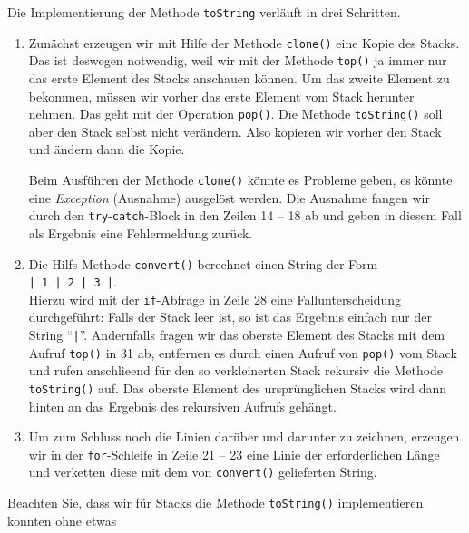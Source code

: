 \begin{enumerate}
      Die Implementierung der Methode \texttt{toString} verl\"auft in drei Schritten.
      \begin{enumerate}
      \item Zun\"achst erzeugen wir mit Hilfe der Methode \texttt{clone()} eine Kopie des
            Stacks.  Das ist deswegen notwendig, weil wir mit der Methode \texttt{top()}
            ja immer nur das erste Element des Stacks anschauen k\"onnen.  Um das zweite
            Element zu bekommen, m\"ussen wir vorher das erste Element vom Stack herunter
            nehmen.  Das geht mit der Operation \texttt{pop()}.  Die Methode
            \texttt{toString()} soll aber den Stack selbst nicht ver\"andern.  Also kopieren
            wir vorher den Stack und \"andern dann die Kopie.

            Beim Ausf\"uhren der Methode \texttt{clone()} k\"onnte es Probleme geben, es
            k\"onnte eine \emph{Exception} (Ausnahme) ausgel\"ost werden.  Die Ausnahme
            fangen wir durch den \texttt{try}-\texttt{catch}-Block in den Zeilen 14 -- 18
            ab und geben in diesem Fall als Ergebnis eine Fehlermeldung zur\"uck.
      \item Die Hilfs-Methode \texttt{convert()} berechnet einen String der Form \\[0.1cm]
            \hspace*{1.3cm} \texttt{| 1 | 2 | 3 |}. \\[0.1cm]
            Hierzu wird mit der \texttt{if}-Abfrage in Zeile 28 eine Fallunterscheidung 
            durchgef\"uhrt: Falls der Stack leer ist, so ist das Ergebnis einfach nur der
            String ``\texttt{|}''.  Andernfalls fragen wir das oberste Element des Stacks
            mit dem Aufruf \texttt{top()} in 31 ab, entfernen es durch einen Aufruf von
            \texttt{pop()} vom Stack und rufen anschlie\3end f\"ur den so verkleinerten Stack
            rekursiv die Methode \texttt{toString()} auf.  Das oberste Element des
            urspr\"unglichen Stacks wird dann hinten an das Ergebnis des rekursiven Aufrufs geh\"angt.
      \item Um zum Schluss noch die Linien dar\"uber und darunter zu zeichnen, erzeugen wir
            in der \texttt{for}-Schleife in Zeile 21 -- 23 eine Linie der erforderlichen
            L\"ange und verketten diese mit dem von \texttt{convert()} gelieferten String.
      \end{enumerate}
\end{enumerate}
Beachten Sie, dass wir f\"ur Stacks die Methode \texttt{toString()} implementieren konnten ohne etwas
